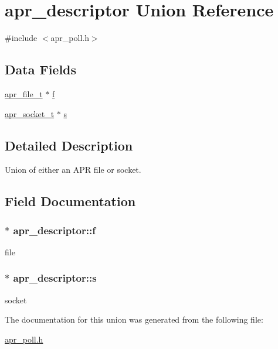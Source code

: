 \hypertarget{unionapr__descriptor}{\section{apr\-\_\-descriptor Union Reference}
\label{unionapr__descriptor}
}


{\ttfamily \#include $<$apr\-\_\-poll.\-h$>$}

\subsection*{Data Fields}
\begin{DoxyCompactItemize}
\item 
\hyperlink{group__apr__file__io_gaa46e4763ac375ea3c7a43ba6f6099e22}{apr\-\_\-file\-\_\-t} $\ast$ \hyperlink{unionapr__descriptor_a69d605f2bb33b05ceedb3d95b744ca7e}{f}
\item 
\hyperlink{group__apr__network__io_ga49262b223e7434746e1f1737659aa2c3}{apr\-\_\-socket\-\_\-t} $\ast$ \hyperlink{unionapr__descriptor_a39a15be8be084afadfa173810b346f6c}{s}
\end{DoxyCompactItemize}


\subsection{Detailed Description}
Union of either an A\-P\-R file or socket. 

\subsection{Field Documentation}
\hypertarget{unionapr__descriptor_a69d605f2bb33b05ceedb3d95b744ca7e}{
\subsubsection[{f}]{$\ast$ apr\-\_\-descriptor\-::f}}\label{unionapr__descriptor_a69d605f2bb33b05ceedb3d95b744ca7e}
file \hypertarget{unionapr__descriptor_a39a15be8be084afadfa173810b346f6c}{
\subsubsection[{s}]{$\ast$ apr\-\_\-descriptor\-::s}}\label{unionapr__descriptor_a39a15be8be084afadfa173810b346f6c}
socket 

The documentation for this union was generated from the following file\-:\begin{DoxyCompactItemize}
\item 
\hyperlink{apr__poll_8h}{apr\-\_\-poll.\-h}\end{DoxyCompactItemize}
